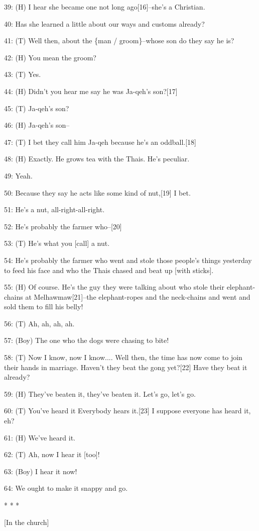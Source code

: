 39: (H) I hear she became one not long ago[16]--she's a Christian.

40: Has she learned a little about our ways and customs already?

41: (T) Well then, about the \{man / groom\}--whose son do they say he is?

42: (H) You mean the groom?

43: (T) Yes.

44: (H) Didn't you hear me say he was Ja-qeh's son?[17]

45: (T) Ja-qeh's son?

46: (H) Ja-qeh's son--

47: (T) I bet they call him Ja-qeh because he's an oddball.[18]

48: (H) Exactly. He grows tea with the Thais. He's peculiar.

49: Yeah.

50: Because they say he acts like some kind of nut,[19] I bet.

51: He's a nut, all-right-all-right.

52: He's probably the farmer who--[20]

53: (T) He's what you [call] a nut.

54: He's probably the farmer who went and stole those people's things yesterday
to feed his face and who the Thais chased and beat up [with sticks].

55: (H) Of course. He's the guy they were talking about who stole their elephant-chains
at Melhawmaw[21]--the elephant-ropes and the neck-chains and went and sold them
to fill his belly!

56: (T) Ah, ah, ah, ah.

57: (Boy) The one who the dogs were chasing to bite!

58: (T) Now I know, now I know.... Well then, the time has now come to join their
hands in marriage. Haven't they beat the gong yet?[22] Have they beat it already?

59: (H) They've beaten it, they've beaten it. Let's go, let's go.

60: (T) You've heard it Everybody hears it.[23] I suppose everyone has heard it,
eh?

61: (H) We've heard it.

62: (T) Ah, now I hear it [too]!

63: (Boy) I hear it now!

64: We ought to make it snappy and go.

\begin{center}
* * *

[In the church]
\end{center}

